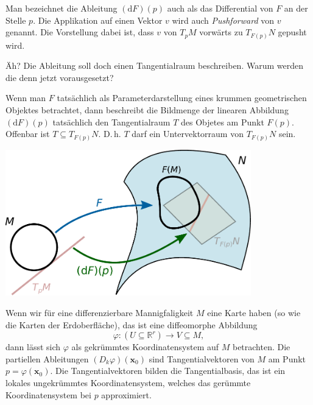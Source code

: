 \documentclass{beamer}
\newcommand{\R}{\mathbb R}
\begin{document}
\begin{frame}
Man bezeichnet die Ableitung $(\mathrm dF)(p)$ auch als das
Differential von $F$ an der Stelle $p$. Die Applikation auf einen
Vektor $v$ wird auch \emph{Pushforward} von $v$ genannt.
Die Vorstellung dabei ist, dass $v$
von $T_pM$ vorwärts zu $T_{F(p)}N$ gepusht wird.
\end{frame}

\begin{frame}
Äh? Die Ableitung soll doch einen Tangentialraum beschreiben.
Warum werden die denn jetzt vorausgesetzt?
\end{frame}

\begin{frame}
Wenn man $F$ tatsächlich als Parameterdarstellung eines krummen
geometrischen Objektes betrachtet, dann beschreibt die Bildmenge
der linearen Abbildung $(\mathrm dF)(p)$ tatsächlich den
Tangentialraum $T$ des Objetes am Punkt $F(p)$. Offenbar ist
$T\subseteq T_{F(p)}N$. D.\,h. $T$ darf ein Untervektorraum
von $T_{F(p)}N$ sein.
\end{frame}

\begin{frame}
\begin{center}
\includegraphics[width=0.8\textwidth]{img/Differential.pdf}
\end{center}
\end{frame}

\begin{frame}
Wenn wir für eine differenzierbare Mannigfaligkeit $M$ eine Karte
haben (so wie die Karten der Erdoberfläche), das ist eine diffeomorphe
Abbildung
\[\varphi\colon (U\subseteq \R^r)\to V\subseteq M,\]
dann lässt sich $\varphi$ als gekrümmtes Koordinatensystem auf $M$
betrachten. Die partiellen Ableitungen $(D_k\varphi)(\mathbf x_0)$ sind
Tangentialvektoren von $M$ am Punkt $p=\varphi(\mathbf x_0)$.
Die Tangentialvektoren bilden die Tangentialbasis, das ist ein lokales
ungekrümmtes Koordinatensystem, welches das gerümmte Koordinatensystem
bei $p$ approximiert. 
\end{frame}
\end{document}
